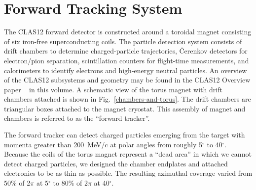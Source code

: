 \section{Forward Tracking System}
\label{overview}

The CLAS12 forward detector is constructed around a toroidal magnet consisting of six 
iron-free superconducting coils.  The particle detection system consists of drift 
chambers to determine charged-particle trajectories, {\v C}erenkov detectors 
for electron/pion separation, scintillation counters for flight-time 
measurements, and calorimeters to identify electrons and high-energy neutral 
particles.  An overview of the CLAS12 subsystems and geometry may be found in the 
CLAS12 Overview paper ~\cite{clas12-overview} in this volume.  A schematic view of the 
torus magnet with drift chambers
attached is shown in Fig.~\ref{chambers-and-torus}.   The drift chambers are 
triangular boxes attached to the magnet cryostat.  
This assembly of magnet and chambers is referred to as the ``forward tracker''. 

The forward tracker can detect charged particles emerging from the target with
momenta greater than 200~MeV/c at polar angles from roughly 5$^{\circ}$ to 
40$^{\circ}$.  Because the coils of the torus magnet represent a ``dead area''
in which we cannot detect charged particles, we designed the chamber endplates
and attached electronics to be as thin as possible.  The resulting azimuthal
coverage varied from 50\% of 2$\pi$ at 5$^{\circ}$ to 80\% of 2$\pi$ at 40$^{\circ}$.


